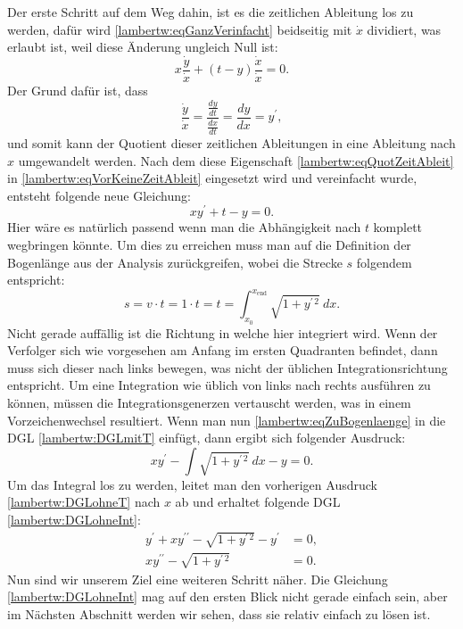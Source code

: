 Der erste Schritt auf dem Weg dahin, ist es die zeitlichen Ableitung los zu werden, dafür wird \eqref{lambertw:eqGanzVerinfacht} beidseitig mit \(\dot{x}\) dividiert, was erlaubt ist, weil diese Änderung ungleich Null ist:
\begin{equation}
	x \frac{\dot{y}}{\dot{x}} + (t-y) \frac{\dot{x}}{\dot{x}}
	= 0.
	\label{lambertw:eqVorKeineZeitAbleit}
\end{equation}
Der Grund dafür ist, dass
\begin{equation}
	\frac{\displaystyle\dot{y}}{\displaystyle\dot{x}} 
	= \frac{\displaystyle\frac{dy}{dt}}{\displaystyle\frac{dx}{dt}}  
	= \frac{dy}{dx}
	= y^{\prime},
	\label{lambertw:eqQuotZeitAbleit}
\end{equation}
und somit kann der Quotient dieser zeitlichen Ableitungen in eine Ableitung nach \(x\) umgewandelt werden.
Nach dem diese Eigenschaft \eqref{lambertw:eqQuotZeitAbleit} in \eqref{lambertw:eqVorKeineZeitAbleit} eingesetzt wird und vereinfacht wurde, entsteht folgende neue Gleichung:
\begin{equation}
	x y^{\prime} + t - y
	= 0.
	\label{lambertw:DGLmitT}
\end{equation}
Hier wäre es natürlich passend wenn man die Abhängigkeit nach \(t\) komplett wegbringen könnte. Um dies zu erreichen muss man auf die Definition der Bogenlänge aus der Analysis zurückgreifen, wobei die Strecke \(s\) folgendem entspricht:
\begin{equation}
	s
	= 
	v \cdot t
	=
	1 \cdot t
	=
	t
	=
	\int_{\displaystyle x_0}^{\displaystyle x_{\text{end}}}\sqrt{1+y^{\prime\, 2}} \: dx.
	\label{lambertw:eqZuBogenlaenge}
\end{equation}
Nicht gerade auffällig ist die Richtung in welche hier integriert wird. Wenn der Verfolger sich wie vorgesehen am Anfang im ersten Quadranten befindet, dann muss sich dieser nach links bewegen, was nicht der üblichen Integrationsrichtung entspricht. Um eine Integration wie üblich von links nach rechts ausführen zu können, müssen die Integrationsgenerzen vertauscht werden, was in einem Vorzeichenwechsel resultiert. Wenn man nun \eqref{lambertw:eqZuBogenlaenge} in die DGL \eqref{lambertw:DGLmitT} einfügt, dann ergibt sich folgender Ausdruck:
\begin{equation}
	x y^{\prime} - \int\sqrt{1+y^{\prime\, 2}} \: dx - y
	= 0.
	\label{lambertw:DGLohneT}
\end{equation}
Um das Integral los zu werden, leitet man den vorherigen Ausdruck \eqref{lambertw:DGLohneT} nach \(x\) ab und erhaltet folgende DGL \eqref{lambertw:DGLohneInt}:
\begin{align}
	y^{\prime}+ xy^{\prime\prime} - \sqrt{1+y^{\prime\, 2}} - y^{\prime}
	&= 0, \\
	xy^{\prime\prime} - \sqrt{1+y^{\prime\, 2}}
	&= 0.
	\label{lambertw:DGLohneInt}
\end{align}
Nun sind wir unserem Ziel eine weiteren Schritt näher. Die Gleichung \eqref{lambertw:DGLohneInt} mag auf den ersten Blick nicht gerade einfach sein, aber im Nächsten Abschnitt werden wir sehen, dass sie relativ einfach zu lösen ist.


